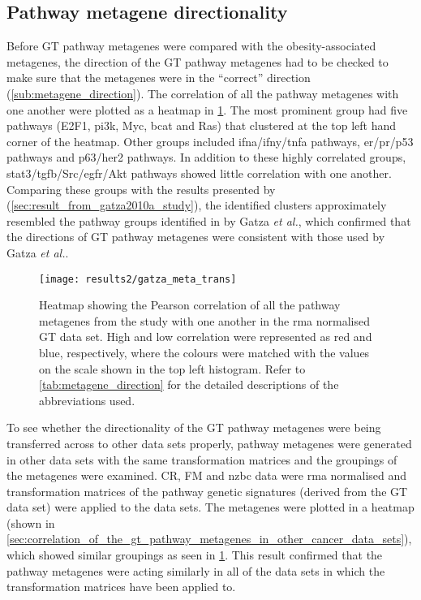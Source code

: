 \subsection{Pathway metagene directionality}
\label{sub:pathway_metagene_directionality}

Before GT pathway metagenes were compared with the obesity-associated metagenes, the direction of the GT pathway metagenes had to be checked to make sure that the metagenes were in the ``correct'' direction (\cref{sub:metagene_direction}).
The correlation of all the pathway metagenes with one another were plotted as a heatmap in \cref{fig:gatza_meta_dir}.
The most prominent group had five pathways (E2F1, \gls{pi3k}, Myc, \gls{bcat} and Ras) that clustered at the top left hand corner of the heatmap.
Other groups included \gls{ifna}/\gls{ifny}/\gls{tnfa} pathways, \gls{er}/\gls{pr}/p53 pathways and p63/\gls{her2} pathways.
In addition to these highly correlated groups, \gls{stat3}/\gls{tgfb}/Src/\gls{egfr}/Akt pathways showed little correlation with one another.
Comparing these groups with the results presented by \citet{Gatza2010a} (\cref{sec:result_from_gatza2010a_study}), the identified clusters approximately resembled the pathway groups identified in by Gatza \textit{et al.}, which confirmed that the directions of GT pathway metagenes were consistent with those used by Gatza \textit{et al.}.

\begin{figure}[htb]
	\centering
	\texttt{[image: results2/gatza\_meta\_trans]}
	\caption[Heatmap of the Pearson correlation of all the pathway metagenes with one another in the \acrshort{rma} normalised GT data]{Heatmap showing the Pearson correlation of all the pathway metagenes from the \citet{Gatza2010a} study with one another  in the \gls{rma} normalised GT data set.
		High and low correlation were represented as red and blue, respectively, where the colours were matched with the values on the scale shown in the top left histogram.
		Refer to \cref{tab:metagene_direction} for the detailed descriptions of the abbreviations used.
		}
	\label{fig:gatza_meta_dir}
\end{figure}

To see whether the directionality of the GT pathway metagenes were being transferred across to other data sets properly, pathway metagenes were generated in other data sets with the same transformation matrices and the groupings of the metagenes were examined.
CR, FM and \gls{nzbc} data were \gls{rma} normalised and transformation matrices of the pathway genetic signatures (derived from the GT data set) were applied to the data sets.
The metagenes were plotted in a heatmap (shown in \cref{sec:correlation_of_the_gt_pathway_metagenes_in_other_cancer_data_sets}), which showed similar groupings  as seen in \cref{fig:gatza_meta_dir}.
This result confirmed that the pathway metagenes were acting similarly in all of the data sets in which the transformation matrices have been applied to.

